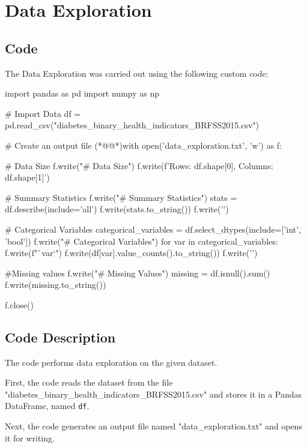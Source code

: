 \documentclass[11pt]{article}
\begin{document}
\section{Data Exploration}
\subsection{{Code}}
The Data Exploration was carried out using the following custom code:

\begin{python}

import pandas as pd
import numpy as np

# Import Data
df = pd.read_csv("diabetes_binary_health_indicators_BRFSS2015.csv")

# Create an output file
(*@@*)with open('data_exploration.txt', 'w') as f:
    
    # Data Size
    f.write("# Data Size\n")
    f.write(f'Rows: {df.shape[0]}, Columns: {df.shape[1]}\n\n')

    # Summary Statistics
    f.write("# Summary Statistics\n")
    stats = df.describe(include='all')
    f.write(stats.to_string())
    f.write('\n\n')
    
    # Categorical Variables
    categorical_variables = df.select_dtypes(include=['int', 'bool'])
    f.write("# Categorical Variables\n")
    for var in categorical_variables:
        f.write(f"`{var}`\n")
        f.write(df[var].value_counts().to_string())
        f.write('\n\n')
    
    #Missing values
    f.write("# Missing Values\n")
    missing = df.isnull().sum()
    f.write(missing.to_string())

f.close()

\end{python}

\subsection{Code Description}

The code performs data exploration on the given dataset. 

First, the code reads the dataset from the file "diabetes\_binary\_health\_indicators\_BRFSS2015.csv" and stores it in a Pandas DataFrame, named \texttt{df}.

Next, the code generates an output file named "data\_exploration.txt" and opens it for writing.
\end{document}
